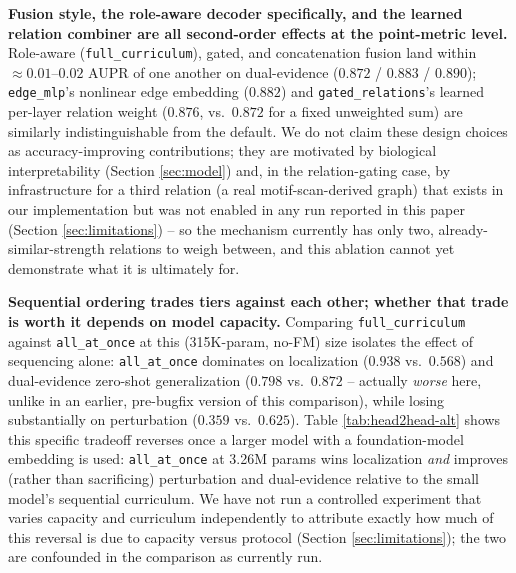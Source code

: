 \documentclass{article}
\theoremstyle{plain}
\theoremstyle{definition}
\begin{document}
\textbf{Fusion style, the role-aware decoder specifically, and the learned
relation combiner are all second-order effects at the point-metric level.}
Role-aware (\texttt{full\_curriculum}), gated, and concatenation fusion land
within $\approx0.01$--$0.02$ AUPR of one another on dual-evidence ($0.872$ /
$0.883$ / $0.890$); \texttt{edge\_mlp}'s nonlinear edge embedding
($0.882$) and \texttt{gated\_relations}'s learned per-layer relation weight
($0.876$, vs.\ $0.872$ for a fixed unweighted sum) are similarly
indistinguishable from the default. We do not claim these design choices as
accuracy-improving contributions; they are motivated by biological
interpretability (Section \ref{sec:model}) and, in the relation-gating
case, by infrastructure for a third relation (a real motif-scan-derived
graph) that exists in our implementation but was not enabled in any run
reported in this paper (Section \ref{sec:limitations}) -- so the mechanism
currently has only two, already-similar-strength relations to weigh between,
and this ablation cannot yet demonstrate what it is ultimately for.

\textbf{Sequential ordering trades tiers against each other; whether that
trade is worth it depends on model capacity.} Comparing
\texttt{full\_curriculum} against \texttt{all\_at\_once} at this (315K-param,
no-FM) size isolates the effect of sequencing alone: \texttt{all\_at\_once}
dominates on localization ($0.938$ vs.\ $0.568$) and dual-evidence zero-shot
generalization ($0.798$ vs.\ $0.872$ -- actually \emph{worse} here, unlike
in an earlier, pre-bugfix version of this comparison), while losing
substantially on perturbation ($0.359$ vs.\ $0.625$). Table
\ref{tab:head2head-alt} shows this specific tradeoff reverses once a larger
model with a foundation-model embedding is used: \texttt{all\_at\_once} at
3.26M params wins localization \emph{and} improves (rather than
sacrificing) perturbation and dual-evidence relative to the small model's
sequential curriculum. We have not run a controlled experiment that varies
capacity and curriculum independently to attribute exactly how much of this
reversal is due to capacity versus protocol (Section
\ref{sec:limitations}); the two are confounded in the comparison as
currently run.
\end{document}
